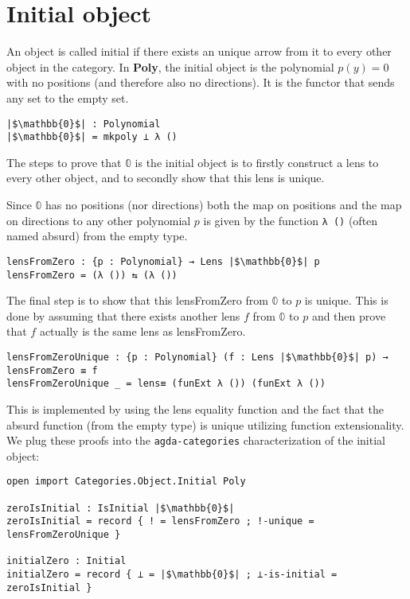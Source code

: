 \section{Initial object}
An object is called initial if there exists an unique arrow from it to every other object in the category. In \textbf{Poly}, the initial object is the polynomial $p(y) = 0$ with no positions (and therefore also no directions). It is the functor that sends any set to the empty set.

\begin{verbatim}
|$\mathbb{0}$| : Polynomial
|$\mathbb{0}$| = mkpoly ⊥ λ ()
\end{verbatim}

The steps to prove that $\mathbb{0}$ is the initial object is to firstly construct a lens to every other object, and to secondly show that this lens is unique. 

Since $\mathbb{0}$ has no positions (nor directions) both the map on positions and the map on directions to any other polynomial $p$ is given by the function \texttt{λ ()} (often named absurd) from the empty type.
\begin{verbatim}
lensFromZero : {p : Polynomial} → Lens |$\mathbb{0}$| p
lensFromZero = (λ ()) ⇆ (λ ())
\end{verbatim}

The final step is to show that this lensFromZero from $\mathbb{0}$ to $p$ is unique. This is done by assuming that there exists another lens $f$ from $\mathbb{0}$ to $p$ and then prove that $f$ actually is the same lens as lensFromZero. 

\begin{verbatim}
lensFromZeroUnique : {p : Polynomial} (f : Lens |$\mathbb{0}$| p) → lensFromZero ≡ f
lensFromZeroUnique _ = lens≡ (funExt λ ()) (funExt λ ())
\end{verbatim}

This is implemented by using the lens equality function and the fact that the absurd function (from the empty type) is unique utilizing function extensionality. We plug these proofs into the \texttt{agda-categories} characterization of the initial object:

\begin{verbatim}
open import Categories.Object.Initial Poly

zeroIsInitial : IsInitial |$\mathbb{0}$|
zeroIsInitial = record { ! = lensFromZero ; !-unique = lensFromZeroUnique }

initialZero : Initial
initialZero = record { ⊥ = |$\mathbb{0}$| ; ⊥-is-initial = zeroIsInitial }
\end{verbatim}



